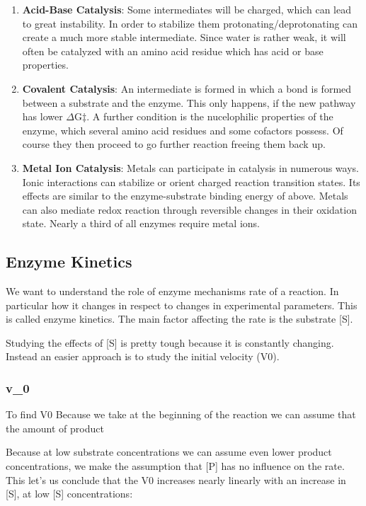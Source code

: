 \documentclass[../main.tex]{subfiles}
\begin{document}
\begin{enumerate}
	\item \textbf{\gls{Acid-Base Catalysis}}: Some intermediates will be charged, which can lead to great instability. In order to stabilize them protonating/deprotonating can create a much more stable intermediate. Since water is rather weak, it will often be catalyzed with an amino acid residue which has acid or base properties.
	\item \textbf{\gls{Covalent Catalysis}}: An intermediate is formed in which a bond is formed between a substrate and the enzyme. This only happens, if the new pathway has lower $\Delta$G$\ddagger$. A further condition is the nucelophilic properties of the enzyme, which several amino acid residues and some cofactors possess. Of course they then proceed to go further reaction freeing them back up.
	\item \textbf{\gls{Metal Ion Catalysis}}: Metals can participate in catalysis in numerous ways. Ionic interactions can stabilize or orient charged reaction transition states. Its effects are similar to the enzyme-substrate binding energy of above. Metals can also mediate redox reaction through reversible changes in their oxidation state. Nearly a third of all enzymes require metal ions.
\end{enumerate}


\subsection{\gls{Enzyme Kinetics}}

We want to understand the role of enzyme mechanisms rate of a reaction. In particular how it changes in respect to changes in experimental parameters. This is called enzyme kinetics. The main factor affecting the rate is the substrate [S]. 

Studying the effects of [S] is pretty tough because it is constantly changing. Instead an easier approach is to study the initial velocity (V0).

\subsubsection{\gls{v_0}}

To find V0 Because we take  at the beginning of the reaction we can assume that the amount of product

Because at low substrate concentrations we can assume even lower product concentrations, we make the assumption that [P] has no influence on the rate. This let's us conclude that the V0 increases nearly linearly with an increase in [S], at low [S] concentrations:
\end{document}
